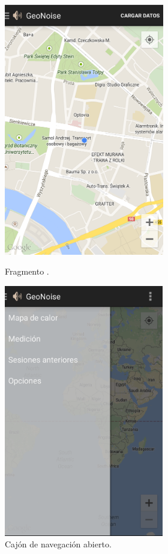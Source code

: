    \begin{figure}[H] \centering
 \begin{minipage}{0.45\textwidth}\centering
    \includegraphics[height=11cm]{graphs/screen_location.png} \caption{Fragmento . }\label{fig:screen:location}
\end{minipage}
\hfill
 \begin{minipage}{0.45\textwidth}\centering
    \includegraphics[height=11cm]{graphs/navdrawer.png} \caption{Cajón de navegación abierto.}\label{fig:screen:navdrawer}
\end{minipage}
\end{figure}


